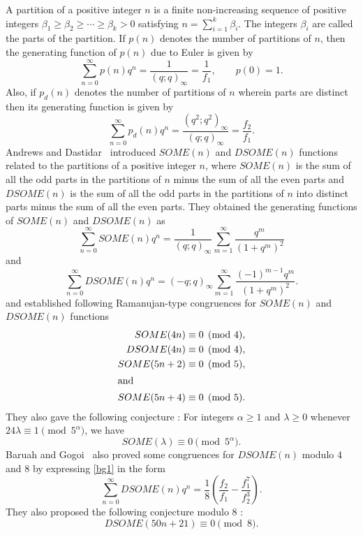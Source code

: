 \documentclass[12pt]{article}
\numberwithin{equation}{section}
\theoremstyle{definition}
\theoremstyle{remark}
\numberwithin{equation}{section}
\begin{document}
A partition of a positive integer $n$ is a finite non-increasing sequence of positive integers
$\beta_1\geq\beta_2\geq\cdots\geq\beta_k>0$ satisfying
$n=\sum_{i=1}^{k}\beta_i$. The integers $\beta_i$ are called the parts of the partition.
If $p(n)$ denotes the number of partitions of $n$, then the  generating function of $p(n)$ due to Euler  \cite{euler1748introductio} is given by
\begin{equation}\label{SDI3}
\sum_{n=0}^{\infty}p(n)q^n
=\dfrac{1}{(q;q)_\infty}
=\dfrac{1}{f_1},
\qquad p(0)=1.
\end{equation}
Also, if  $p_{d}(n)$ denotes the number of partitions of $n$ wherein parts are distinct then its generating function is given by 
\begin{equation}\label{DSM8M25}
\sum_{n=0}^{\infty}p_{d}(n)q^n=\dfrac{(q^2;q^2)_\infty}{(q;q)_\infty}=\dfrac{f_2}{f_1}.   
\end{equation}
Andrews and Dastidar~\cite{MG} introduced $SOME(n)$  and $DSOME(n)$ functions related to the  partitions  of a positive integer $n$, where $SOME(n)$ is the sum of all the odd parts in the partitions of $n$ minus the sum of all the even parts and $DSOME(n)$ is the
sum of all the odd parts in the partitions of $n$ into distinct parts minus
the sum of all the even parts. They obtained the  generating functions of $SOME(n)$  and $DSOME(n)$  as
\begin{equation}\label{SDI4}
\sum_{n=0}^{\infty}SOME(n)q^n
=
\dfrac{1}{(q;q)_\infty}
\sum_{m=1}^{\infty}\dfrac{q^m}{(1+q^m)^2}
\end{equation}
and
\begin{equation}\label{bg1}\sum_{n=0}^{\infty}DSOME(n)q^n
=
(-q;q)_\infty
\sum_{m=1}^{\infty}
\dfrac{(-1)^{m-1}q^m}{(1+q^m)^2}.\end{equation}
and established following Ramanujan-type congruences for $SOME(n)$  and $DSOME(n)$ functions
\begin{align*}
SOME(4n)&\equiv0\pmod{4},\\
DSOME(4n)&\equiv0\pmod{4},\\
SOME(5n+2)&\equiv0\pmod{5},\\
\intertext{and}
SOME(5n+4)&\equiv0\pmod{5}.\\
\end{align*}
They also gave the following conjecture \cite[p. 8, (3)]{MG}: For integers  $\alpha\ge 1$  and $\lambda \ge0$  whenever $24\lambda\equiv1\pmod{5^\alpha}$, we have
\begin{equation}\label{sc}
SOME(\lambda)\equiv0\pmod{5^\alpha}.
\end{equation}
Baruah and Gogoi~\cite{NDB}  also proved some congruences for $DSOME(n)$ modulo $4$ and $8$ by expressing \eqref{bg1} in the form
\begin{equation}\label{SDI10}
	\sum_{n=0}^{\infty}DSOME(n)q^n
	=
	\dfrac{1}{8}
	\left(
	\dfrac{f_2}{f_1}
	-
	\dfrac{f_1^7}{f_2^3}
	\right).
\end{equation} They also proposed the following conjecture modulo 8 \cite[p. 14, Conjecture 4.1]{NDB}:
\begin{equation}\label{SDI11}
DSOME(50n+21)\equiv0\pmod{8}.
\end{equation}
\end{document}
